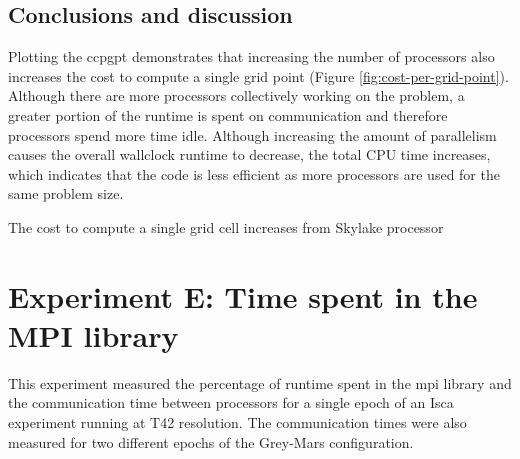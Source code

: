 \documentclass[a4paper,11pt]{report}
\begin{document}
\subsection{Conclusions and discussion}
Plotting the \gls{ccpgpt} demonstrates that increasing the number of processors also increases the cost to compute a single grid point (Figure \ref{fig:cost-per-grid-point}). Although there are more processors collectively working on the problem, a greater portion of the runtime is spent on communication and therefore processors spend more time idle. Although increasing the amount of parallelism causes the overall wallclock runtime to decrease, the total CPU time increases, which indicates that the code is less efficient as more processors are used for the same problem size. 
\par
The cost to compute a single grid cell increases from Skylake processor 

\section{Experiment E: Time spent in the MPI library}
\label{sec:mpi-comms}
This experiment measured the percentage of runtime spent in the \gls{mpi} library and the communication time between processors for a single epoch of an Isca experiment running at T42 resolution. The communication times were also measured for two different epochs of the Grey-Mars configuration.
\end{document}
